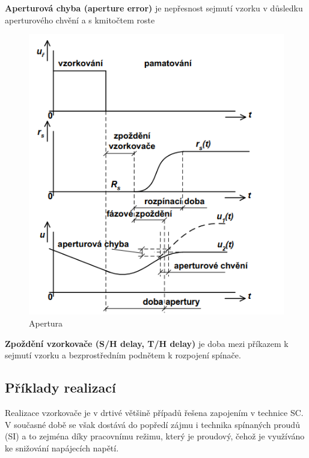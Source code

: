 \textbf{Aperturová chyba (aperture error)} je nepřesnost sejmutí vzorku v důsledku aperturového
chvění a s kmitočtem roste
   \begin{figure}[h]
   \begin{center}
     \includegraphics[scale=0.6]{images/Apertura.png}
   \end{center}
   \caption{Apertura}
  \end{figure}
  
\textbf{Zpoždění vzorkovače (S/H delay, T/H delay)} je doba mezi příkazem k sejmutí vzorku a bezprostředním podnětem k rozpojení spínače.

\subsection{Příklady realizací}
Realizace vzorkovače je v drtivé většině případů řešena zapojením v technice SC. V současné době se však dostává do popředí zájmu i technika spínaných proudů (SI) a to zejména díky pracovnímu režimu, který je proudový, čehož je využíváno ke snižování napájecích napětí.







